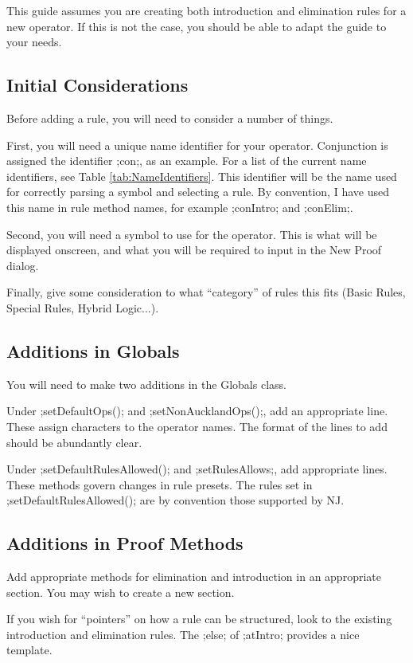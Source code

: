 \documentclass[a4paper]{article}
\begin{document}
This guide assumes you are creating both introduction and elimination rules for a new operator. If this is not the case, you should be able to adapt the guide to your needs.

\subsection{Initial Considerations}
Before adding a rule, you will need to consider a number of things.

First, you will need a unique name identifier for your operator. Conjunction is assigned the identifier ;con;, as an example. For a list of the current name identifiers, see Table \ref{tab:NameIdentifiers}. This identifier will be the name used for correctly parsing a symbol and selecting a rule. By convention, I have used this name in rule method names, for example ;conIntro; and ;conElim;.

Second, you will need a symbol to use for the operator. This is what will be displayed onscreen, and what you will be required to input in the New Proof dialog.

Finally, give some consideration to what ``category'' of rules this fits (Basic Rules, Special Rules, Hybrid Logic...).

\subsection{Additions in Globals}
\label{subsec:AddInGlobals}
You will need to make two additions in the Globals class.

Under ;setDefaultOps(); and ;setNonAucklandOps();, add an appropriate line. These assign characters to the operator names. The format of the lines to add should be abundantly clear.

Under ;setDefaultRulesAllowed(); and ;setRulesAllows;, add appropriate lines. These methods govern changes in rule presets. The rules set in ;setDefaultRulesAllowed(); are by convention those supported by NJ.

\subsection{Additions in Proof Methods}
Add appropriate methods for elimination and introduction in an appropriate section. You may wish to create a new section.

If you wish for ``pointers'' on how a rule can be structured, look to the existing introduction and elimination rules. The ;else; of ;atIntro;  provides a nice template.
\end{document}
